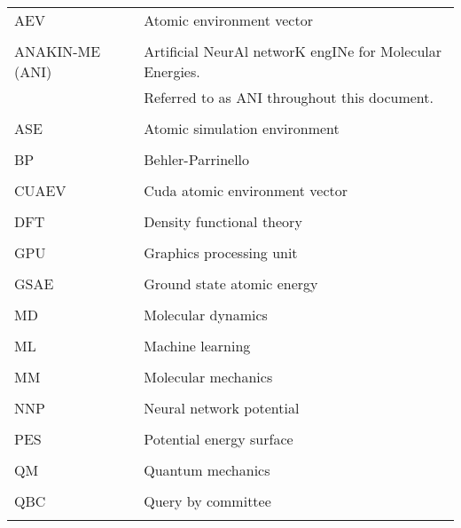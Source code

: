\singlespacing
\begin{tabular}{l p{5in}} 
AEV & Atomic environment vector\\
\\
ANAKIN-ME (ANI) & Artificial NeurAl networK engINe for Molecular Energies.\\
 & Referred to as ANI throughout this document.\\
\\
ASE & Atomic simulation environment\\
\\
BP & Behler-Parrinello\\
\\
CUAEV & Cuda atomic environment vector\\
\\
DFT & Density functional theory\\
\\
GPU & Graphics processing unit\\
\\
GSAE & Ground state atomic energy\\
\\
MD & Molecular dynamics\\
\\
ML & Machine learning\\
\\
MM & Molecular mechanics\\
\\
NNP & Neural network potential\\
\\
PES & Potential energy surface\\
\\
QM & Quantum mechanics\\
\\
QBC & Query by committee\\
\\


\end{tabular}
\doublespacing
